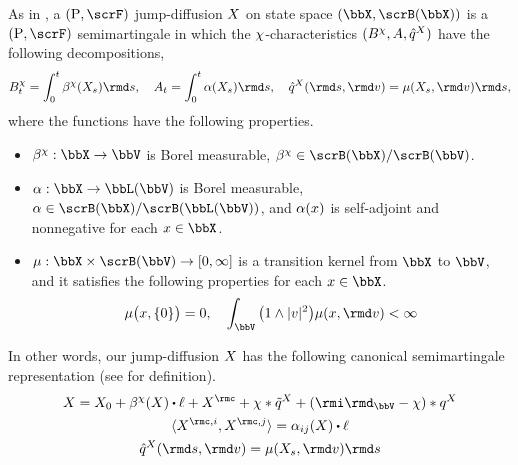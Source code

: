 As in \cite[Definition III.2.18]{jacod2003}, a $(\Prb, \scrF)$ jump-diffusion $X$ on state space $(\stateSpace, \scrB(\stateSpace))$ is a $(\Prb, \scrF)$ semimartingale in which the $\chi$-characteristics $(B^\chi, A, \hat{q}^X)$ have the following decompositions,
\begin{equation}
  \label{eq:jump-diffusion-characteristics}
  B^\trunc_t = \int_0^t \affDrift^\trunc(\X_s) \rmd s, \quad 
  A_t = \int_0^t \affDiff(\X_s) \rmd s, \quad
  \predproj{\jumpMeas^\X}(\rmd s,\rmd\markVar) = \affJump(\X_s, \rmd\markVar) \rmd s,
\end{equation}
where the functions have the following properties.
\begin{itemize}
  \item
    $\affDrift^\trunc: \stateSpace \rightarrow \vecSpace$ is Borel measurable, $\affDrift^\trunc \in \scrB(\stateSpace)/\scrB(\vecSpace)$.
  \item
    $\affDiff: \stateSpace \rightarrow \bbL(\vecSpace)$ is Borel measurable, $\affDiff \in \scrB(\stateSpace)/\scrB(\bbL(\vecSpace))$, and $\alpha(x)$ is self-adjoint and nonnegative for each $\stateVar \in \stateSpace$.
  \item
    $\affJump: \stateSpace \times \scrB(\vecSpace) \rightarrow [0,\infty]$ is a transition kernel from $\stateSpace$ to $\vecSpace$, and it satisfies the following properties for each $\stateVar \in \stateSpace$.
    \[
      \affJump\big(\stateVar, \{0\}\big) = 0, \quad \int_\vecSpace \big( 1 \wedge |\markVar|^2\big) \affJump(\stateVar, \rmd\markVar) < \infty
    \]
\end{itemize}
In other words, our jump-diffusion $X$ has the following canonical semimartingale representation (see \cite[Theorem II.2.34]{jacod2003} for definition).
\begin{equation}
  \label{eq:jump-diffusion-canonical}
  \begin{gathered}
    \X = \X_0 + \affDrift^\trunc(\X) \shortInt \leb + \X^\rmc +  \trunc \ast \compensate{\jumpMeas^\X} + (\id_\vecSpace - \trunc) \ast \jumpMeas^\X \\
    \prj{\X^{\rmc,i}}{\X^{\rmc,j}} = \affDiff_{ij}(\X) \shortInt \leb \\
    \predproj{\jumpMeas^\X}(\rmd s, \rmd\markVar) = \affJump(\X_s, \rmd\markVar) \rmd s
  \end{gathered}
\end{equation}




